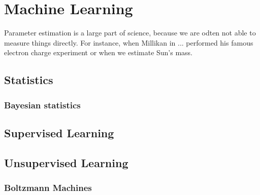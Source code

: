 \section{Machine Learning}
Parameter estimation is a large part of science, because we are odten not able to measure things directly. For instance, when Millikan in ... performed his famous electron charge experiment or when we estimate Sun's mass. 
\subsection{Statistics}
\subsubsection{Bayesian statistics}
\subsection{Supervised Learning}
\subsection{Unsupervised Learning}
\subsubsection{Boltzmann Machines}